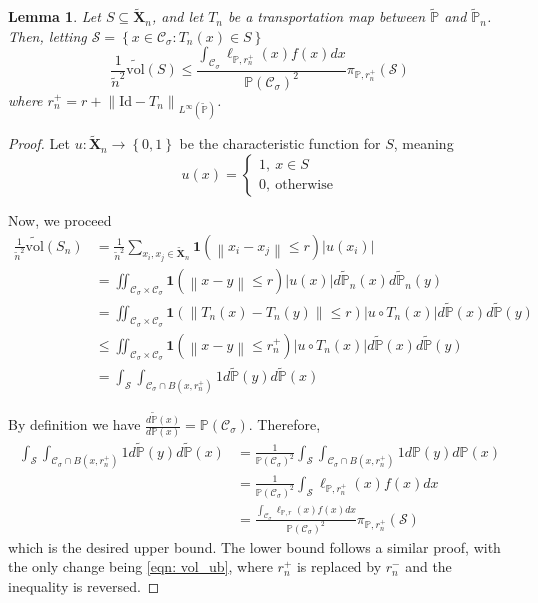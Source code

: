 \documentclass{article}
\newcommand{\norm}[1]{\left\lVert#1\right\rVert}
\newcommand{\abs}[1]{\left \lvert #1 \right \rvert}
\newcommand{\set}[1]{\left\{#1\right\}}
\newcommand{\Xbf}{\mathbf{X}}
\newcommand{\Cset}{\mathcal{C}}
\newcommand{\Sset}{\mathcal{S}}
\newcommand{\Csig}{\Cset_{\sigma}}
\newcommand{\Pbb}{\mathbb{P}}
\newcommand{\1}{\mathbf{1}}
\newcommand{\vol}{\mathrm{vol}}
\theoremstyle{alden}
\theoremstyle{aldenthm}
\newtheorem{lemma}{Lemma}
\theoremstyle{remark}
\begin{document}
\begin{lemma}
	\label{lem: volume_bound}
	Let $S \subseteq \widetilde{\Xbf}_n$, and let $T_n$ be a transportation map between $\widetilde{\Pbb}$ and $\widetilde{\Pbb}_n$. Then, letting $\Sset = \set{x \in \Csig: T_n(x) \in S}$
	\begin{equation*}
	\frac{1}{\widetilde{n}^2}\widetilde{\vol}(S) \leq \frac{\int_{\Csig} \ell_{\Pbb,r_n^+}(x) f(x) dx}{\Pbb(\Csig)^2} \pi_{\Pbb,r_n^+}(\Sset)
	\end{equation*}
	where $r_n^+ = r + \norm{\mathrm{Id} - T_n}_{L^{\infty}(\widetilde{\Pbb})}$. 
\end{lemma}
\begin{proof}
	Let $u: \widetilde{\Xbf}_n \to \set{0,1}$ be the characteristic function for $S$, meaning
	\begin{equation*}
	u(x) = 
	\begin{cases}
	1,~ x \in S \\
	0,~ \text{otherwise}
	\end{cases}
	\end{equation*}
	
	Now, we proceed
	\begin{align}
	\frac{1}{\widetilde{n}^2} \widetilde{\vol}(S_n) & = \frac{1}{\widetilde{n}^2} \sum_{x_i, x_j \in \widetilde{\Xbf}_n} \1(\norm{x_i - x_j} \leq r) \abs{u(x_i)} \nonumber \\
	& = \iint_{\Csig \times \Csig} \1(\norm{x - y} \leq r) \abs{u(x)} d\widetilde{\Pbb}_n(x) d\widetilde{\Pbb}_n(y) \nonumber \\
	& =  \iint_{\Csig \times \Csig} \1(\norm{T_n(x) - T_n(y)} \leq r) \abs{u \circ T_n(x)} d\widetilde{\Pbb}(x) d\widetilde{\Pbb}(y) \nonumber \\
	& \leq \iint_{\Csig \times \Csig} \1(\norm{x - y} \leq r_n^+) \abs{u \circ T_n(x)} d\widetilde{\Pbb}(x) d\widetilde{\Pbb}(y) \label{eqn: vol_ub}\\
	& = \int_{\Sset} \int_{\Csig \cap B(x,r_n^+)} 1 d\widetilde{\Pbb}(y) d\widetilde{\Pbb}(x) \nonumber
	\end{align}
	
	By definition we have $\frac{d\widetilde{\Pbb}(x)}{d\Pbb(x)} = \Pbb(\Csig)$. Therefore,
	\begin{align*}
	\int_{\Sset} \int_{\Csig \cap B(x,r_n^+)} 1 d\widetilde{\Pbb}(y) d\widetilde{\Pbb}(x) & = \frac{1}{\Pbb(\Csig)^2}\int_{\Sset} \int_{\Csig \cap B(x,r_n^+)} 1 d\Pbb(y) d\Pbb(x) \\
	& = \frac{1}{\Pbb(\Csig)^2}\int_{\Sset} \ell_{\Pbb,r_n^+}(x) f(x) dx \\
	& = \frac{\int_{\Csig} \ell_{\Pbb,r}(x) f(x) dx}{\Pbb(\Csig)^2} \pi_{\Pbb,r_n^+}(\Sset)
	\end{align*}
	which is the desired upper bound. The lower bound follows a similar proof, with the only change being \eqref{eqn: vol_ub}, where $r_n^+$ is replaced by $r_n^-$ and the inequality is reversed.
\end{proof}
\end{document}
